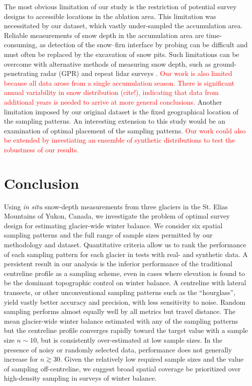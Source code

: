 \documentclass[twocolumn,letterpaper]{igs}
\begin{document}
The most obvious limitation of our study is the restriction of potential survey designs to accessible locations in the ablation area. This limitation was necessitated by our dataset, which vastly under-sampled the accumulation area.
Reliable measurements of snow depth in the accumulation area are time-consuming, as detection of the snow--firn interface by probing can be difficult and must often be replaced by the excavation of snow pits. 
Such limitations can be overcome with alternative methods of measuring snow depth, such as ground-penetrating radar (GPR) \citep[e.g.][]{Machguth2006, Gusmeroli2014, McGrath2015} and repeat lidar surveys \citep[e.g.][]{Sold2013}. 
\textcolor{red}{Our work is also limited because all data arose from a single accumulation season. There is significant annual variability in snow distribution (cite!), indicating that data from additional years is needed to arrive at more general conclusions.}
Another limitation imposed by our original dataset is the fixed geographical location of the sampling patterns. An interesting extension to this study would be an examination of optimal placement of the sampling patterns. \textcolor{red}{Our work could also be extended by investiating an ensemble of synthetic distributions to test the robustness of our results. }

\section{Conclusion}

Using {\it in situ} snow-depth measurements from three glaciers in the St. Elias Mountains of Yukon, Canada, we investigate the problem of optimal survey design for estimating glacier-wide winter balance. We consider six spatial sampling patterns and the full range of sample sizes permitted by our methodology and dataset. Quantitative criteria allow us to rank the performance of each sampling pattern for each glacier in tests with real- and synthetic data. A persistent result in our analysis is the inferior performance of the traditional centreline profile as a sampling scheme, even in cases where elevation is found to be the dominant topographic control on winter balance. A centreline with lateral transects, or other unconventional sampling patterns such as the ``hourglass'', yield vastly better accuracy and precision, with less sensitivity to noise. Random sampling performs almost equally well by all metrics but travel distance. The mean glacier-wide winter balance estimated with any of the sampling patterns but the centreline profile converges rapidly toward the target value with a sample size $n \sim 10$, but is consistently over-estimated at low sample sizes. In the presence of noisy or randomly selected data, performance does not generally increase for $n \gtrsim 30$. Given the relatively low required sample sizes and the value of sampling off-centreline, we suggest broad spatial coverage be prioritized over high-density sampling in surveys of winter balance.  
\end{document}
